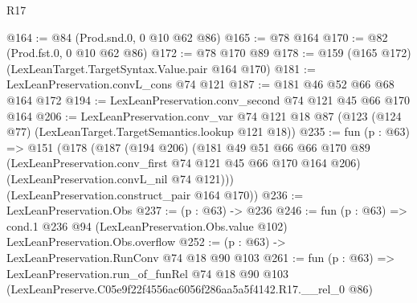 \begin{lexlean}{R17}
\begin{coremodule}
@164 := @84 (Prod.snd.{0, 0} @10 @62 @86)
@165 := @78 @164
@170 := @82 (Prod.fst.{0, 0} @10 @62 @86)
@172 := @78 @170 @89
@178 := @159 (@165 @172) (LexLeanTarget.TargetSyntax.Value.pair @164 @170)
@181 := LexLeanPreservation.convL_cons @74 @121
@187 := @181 @46 @52 @66 @68 @164 @172
@194 := LexLeanPreservation.conv_second @74 @121 @45 @66 @170 @164
@206 := LexLeanPreservation.conv_var
    @74
    @121
    @18
    @87
    (@123 (@124 @77) (LexLeanTarget.TargetSemantics.lookup @121 @18))
@235 := fun (p : @63) =>
  @151
    (@178
      (@187
        (@194 @206)
        (@181
          @49
          @51
          @66
          @66
          @170
          @89
          (LexLeanPreservation.conv_first @74 @121 @45 @66 @170 @164 @206)
          (LexLeanPreservation.convL_nil @74 @121)))
      (LexLeanPreservation.construct_pair @164 @170))
@236 := LexLeanPreservation.Obs
@237 := (p : @63) -> @236
@246 := fun (p : @63) =>
  cond.{1} @236 @94 (LexLeanPreservation.Obs.value @102) LexLeanPreservation.Obs.overflow
@252 := (p : @63) -> LexLeanPreservation.RunConv @74 @18 @90 @103
@261 := fun (p : @63) =>
  LexLeanPreservation.run_of_funRel
    @74
    @18
    @90
    @103
    (LexLeanPreserve.C05e9f22f4556ac6056f286aa5a5f4142.R17.__rel_0 @86)
\end{coremodule}
\end{lexlean}
